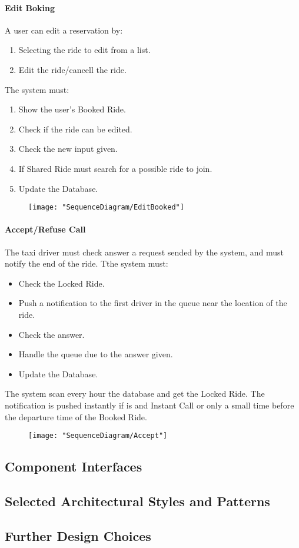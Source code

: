 		\paragraph{Edit Boking}
			A user can edit a reservation by:\begin{enumerate}
				\item Selecting the ride to edit from a list.
				\item Edit the ride/cancell the ride.
			\end{enumerate}
			The system must:\begin{enumerate}
				\item Show the user's Booked Ride.
				\item Check if the ride can be edited.
				\item Check the new input given.
				\item If Shared Ride must search for a possible ride to join\askpippo.
				\item Update the Database.
				\end{enumerate}
				\newpage
				\begin{figure}[h!]
					\centering
					\texttt{[image: "SequenceDiagram/EditBooked"]}
				\end{figure}
				\newpage

			\paragraph{Accept/Refuse Call}
				The taxi driver must check answer a request sended by the system, and must notify the end of the ride.
				Tthe system must:\begin{itemize}
					\item Check the Locked Ride.
					\item Push a notification to the first driver in the queue near the location of the ride.
					\item Check the answer.
					\item Handle the queue due to the answer given.
					\item Update the Database.
				\end{itemize}
				The system scan every hour the database and get the Locked Ride.
				The notification is pushed instantly if is and Instant Call or only a small time before the departure time of the Booked Ride\askpippo.
				\newpage
				\begin{figure}
					\centering
					\texttt{[image: "SequenceDiagram/Accept"]}
				\end{figure}


\subsection{Component Interfaces}

\subsection{Selected Architectural Styles and Patterns}

\subsection{Further Design Choices}
